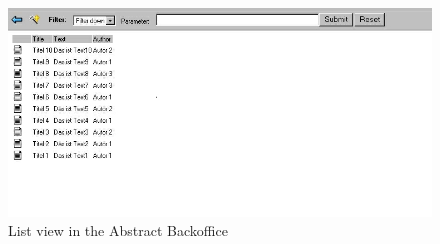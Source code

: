 \begin{figure}
\begin{center}
\includegraphics[clip,width=\sgw]{pics/backOffice/list}
\end{center}
\caption[List view in the Abstract Backoffice]
	{List view in the Abstract Backoffice}
\label{AbstactBO}\jtabd
\end{figure}


